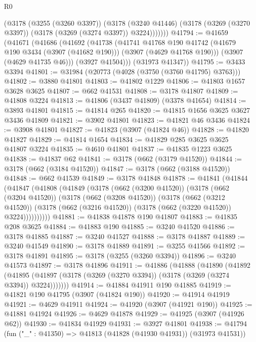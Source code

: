 \begin{lexlean}{R0}
\begin{coremodule}
          (@3178
            (@3255 (@3260 @3397))
            (@3178
              (@3240 @41446)
              (@3178 (@3269 (@3270 @3397)) (@3178 (@3269 (@3274 @3397)) @3224)))))))
@41794 := @41659
    (@41671
      (@41686
        (@41692
          (@41738
            (@41741
              @41768
              @190
              @41742
              (@41679 @190 @3434 (@3907 (@41682 @190)))
              (@3907 (@4629 @41768 @190)))
            (@3907 (@4629 @41735 @46)))
          (@3927 @41504)))
      (@31973 @41347))
@41795 := @3433 @3394
@41801 := @31984 (@20773 (@4028 (@3750 (@3760 @41795) @3763)))
@41802 := @3880 @41801
@41803 := @41802 @1229
@41806 := @41803 @1657 @3628 @3625
@41807 := @662 @41531
@41808 := @3178 @41807
@41809 := @41808 @3224
@41813 := @41806 (@3437 @41809) (@3378 @41654)
@41814 := @3893 @41801
@41815 := @41814 @265
@41820 := @41815 @1656 @3625 @3627 @3436 @41809
@41821 := @3902 @41801
@41823 := @41821 @46 @3436
@41824 := @3908 @41801
@41827 := @41823 (@3907 (@41824 @46))
@41828 := @41820 @41827
@41829 := @41814 @1654
@41834 := @41829 @285 @3625 @3625 @41807 @3224
@41835 := @4610 @41801
@41837 := @41835 @1223 @3625
@41838 := @41837 @62
@41841 := @3178 (@662 (@3179 @41520))
@41844 := @3178 (@662 (@3184 @41520))
@41847 := @3178 (@662 (@3188 @41520))
@41848 := @662 @41539
@41849 := @3178 @41848
@41878 := @41841
    (@41844
      (@41847
        (@41808
          (@41849
            (@3178
              (@662 (@3200 @41520))
              (@3178
                (@662 (@3204 @41520))
                (@3178
                  (@662 (@3208 @41520))
                  (@3178
                    (@662 (@3212 @41520))
                    (@3178 (@662 (@3216 @41520)) (@3178 (@662 (@3220 @41520)) @3224))))))))))
@41881 := @41838 @41878 @190 @41807
@41883 := @41835 @208 @3625
@41884 := @41883 @190
@41885 := @3240 @41520
@41886 := @3178 @41885
@41887 := @3240 @41527
@41888 := @3178 @41887
@41889 := @3240 @41549
@41890 := @3178 @41889
@41891 := @3255 @41566
@41892 := @3178 @41891
@41895 := @3178 (@3255 (@3260 @3394))
@41896 := @3240 @41573
@41897 := @3178 @41896
@41911 := @41886
    (@41888
      (@41890
        (@41892
          (@41895 (@41897 (@3178 (@3269 (@3270 @3394)) (@3178 (@3269 (@3274 @3394)) @3224)))))))
@41914 := @41884 @41911 @190 @41885
@41919 := @41821 @190 @41795 (@3907 (@41824 @190))
@41920 := @41914 @41919
@41921 := @4629 @41911
@41924 := @41920 (@3907 (@41921 @190))
@41925 := @41881 @41924
@41926 := @4629 @41878
@41929 := @41925 (@3907 (@41926 @62))
@41930 := @41834 @41929
@41931 := @3927 @41801
@41938 := @41794 (fun ("_" : @41350) => @41813 (@41828 (@41930 @41931)) (@31973 @41531))

\end{coremodule}
\end{lexlean}
